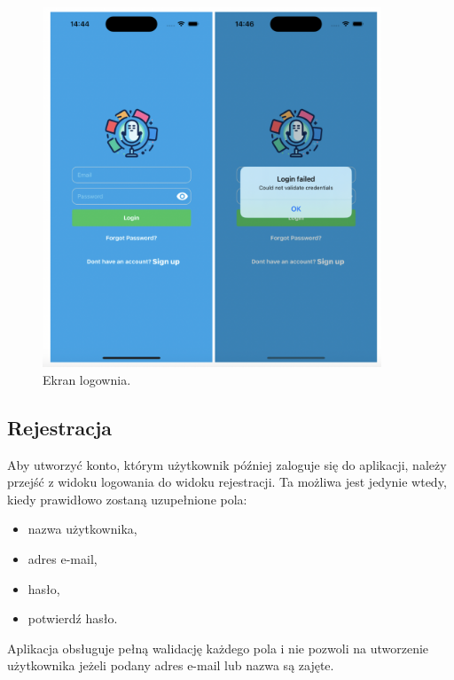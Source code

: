 \begin{figure}[H]
    \centering
    \includegraphics[width=0.9\textwidth]{chapters/chapter_10/images_mobile/mobile_login}
    \caption{Ekran logownia.}
    \label{img:mobile_login}
\end{figure}


\subsection{Rejestracja}
Aby utworzyć konto, którym użytkownik później zaloguje się do aplikacji, należy przejść z widoku logowania do widoku rejestracji. Ta możliwa jest jedynie wtedy, kiedy prawidłowo zostaną uzupełnione pola:
\begin{itemize}
    \item nazwa użytkownika,
    \item adres e-mail,
    \item hasło,
    \item potwierdź hasło.
\end{itemize}
Aplikacja obsługuje pełną walidację każdego pola i nie pozwoli na utworzenie użytkownika jeżeli podany adres e-mail lub nazwa są zajęte.


